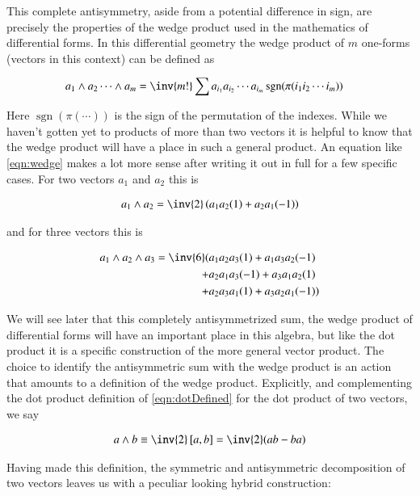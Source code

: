 \documentclass{article}
\newcommand{\antisymmetric}[2]{\left[{#1},{#2}\right]}
\DeclareMathOperator{\sgn}{sgn}
\begin{document}
This complete antisymmetry, aside from a potential difference in sign, are precisely the properties of the wedge product used in the mathematics of differential forms.  In this differential geometry the wedge product of $m$ one-forms (vectors in this context) can be defined as

\begin{align}\label{eqn:wedge}
a_1 \wedge a_2 \cdots \wedge a_m
&= \inv{m!} \sum a_{i_1} a_{i_2} \cdots a_{i_m} \sgn(\pi(i_1 i_2 \cdots i_m))
\end{align}

Here $\sgn(\pi(\cdots))$ is the sign of the permutation of the indexes.  While we haven't gotten yet to products of more than two vectors it is helpful to know that the wedge product will have a place in such a general product.   An equation like \ref{eqn:wedge} makes a lot more sense after writing it out in full for a few specific cases.  For two vectors $a_1$ and $a_2$ this is

\begin{align}\label{eqn:wedgeTwo}
a_1 \wedge a_2 = \inv{2}
\left( a_1 a_2 (1) + a_2 a_1 (-1) \right)
\end{align}

and for three vectors this is

\begin{align*}
a_1 \wedge a_2 \wedge a_3 = \inv{6}
(
&a_1 a_2 a_3 (1) + a_1 a_3 a_2 (-1) \\
+&a_2 a_1 a_3 (-1) + a_3 a_1 a_2 (1) \\
+&a_2 a_3 a_1 (1) + a_3 a_2 a_1 (-1) )
\end{align*}

We will see later that this completely antisymmetrized sum, the wedge product of differential forms will have an important place in this algebra, but like the dot product it is a specific construction of the more general vector product.  The choice to identify the antisymmetric sum with the wedge product is an action that amounts to a definition of the wedge product.  Explicitly, and complementing
the dot product definition of \ref{eqn:dotDefined} for the dot product
of two vectors, we say

\begin{align}\label{eqn:wedgeDefined}
a \wedge b \equiv \inv{2} \antisymmetric{a}{b} = \inv{2} ( a b - b a )
\end{align}

Having made this definition, the symmetric and antisymmetric decomposition of two vectors leaves us with a peculiar looking hybrid construction:
\end{document}
